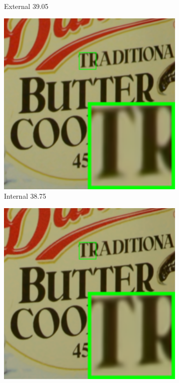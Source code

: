 \begin{figure}
\begin{subfigure}[t]{0.19\textwidth}
		\caption{External 39.05}
    \end{subfigure}
    \hfill
    \begin{subfigure}[t]{0.19\textwidth}
        \centering
        \includegraphics[width=1\textwidth]{images/guided/resize_br_Online_CC_Noisy_Nikon_D600_ISO_3200_C1_96.png}
\caption{Internal 38.75}
    \end{subfigure}
    \hfill
    \begin{subfigure}[t]{0.19\textwidth}
        \centering
        \includegraphics[width=1\textwidth]{images/guided/resize_br_Guided_CC_Noisy_Nikon_D600_ISO_3200_C1_96.png}

\end{subfigure}
\end{figure}
